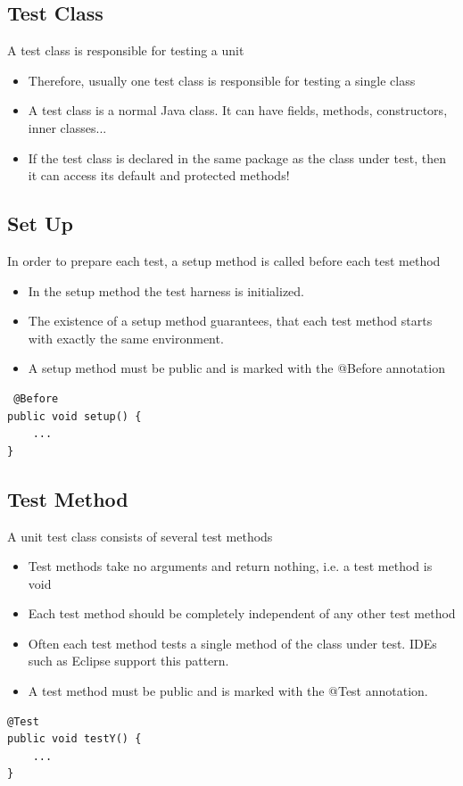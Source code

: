 \documentclass[a4paper,10pt]{article}
\begin{document}
\subsection{Test Class}
A test class is responsible for testing a unit
\begin{itemize}
	\item Therefore, usually one test class is responsible for testing a single class
	\item A test class is a normal Java class. It can have fields, methods, constructors, inner classes...
	\item If the test class is declared in the same package as the class under test, then it can access its default and protected methods!
\end{itemize}
\subsection{Set Up}
In order to prepare each test, a setup method is called before each test method
\begin{itemize}
	\item In the setup method the test harness is initialized.
	\item The existence of a setup method guarantees, that each test method starts with exactly the same environment.
	\item A setup method must be public and is marked with the @Before annotation
\end{itemize}
\begin{lstlisting}
￼@Before
public void setup() {
	... 
}
\end{lstlisting}

\subsection{Test Method}
A unit test class consists of several test methods
\begin{itemize}
	\item Test methods take no arguments and return nothing, i.e. a test method is void
	\item Each test method should be completely independent of any other test method
	\item Often each test method tests a single method of the class under test. IDEs such as Eclipse support this pattern.
	\item A test method must be public and is marked with the @Test annotation.
\end{itemize}
\begin{lstlisting}
@Test
public void testY() {
	... 
}
\end{lstlisting}
\end{document}
